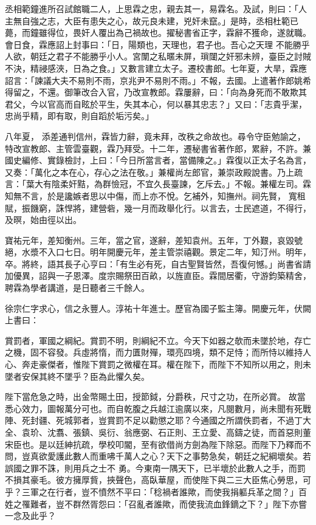 \begin{pinyinscope}
 丞相範鐘進所召試館職二人，上思霖之忠，親去其一，易霖名。及試，則曰：「人主無自強之志，大臣有患失之心，故元良未建，兇奸未竄。」是時，丞相杜範已薨，而鐘雖得位，畏奸人覆出為己禍故也。擢秘書省正字，霖辭不獲命，遂就職。會日食，霖應詔上封事曰：「日，陽類也，天理也，君子也。吾心之天理
 不能勝乎人欲，朝廷之君子不能勝乎小人。宮闈之私暱未屏，瑣闥之奸邪未辨，臺臣之討賊不決，精祲感浹，日為之食。」又數言建立太子。遷校書郎。七年夏，大旱，霖應詔言：「諫議大夫不易則不雨，京兆尹不易則不雨。」不報，去國。上遣著作郎姚希得留之，不還。御筆改合入官，乃改宣教郎。霖屢辭，曰：「向為身死而不敢欺其君父，今以官高而自眩於平生，失其本心，何以暴其忠志？」又曰：「志貴乎潔，忠尚乎精，即有取，則自蹈於垢污矣。」



 八年夏，
 添差通判信州，霖皆力辭，竟未拜，改秩之命故也。尋令守臣勉諭之，特改宣教郎、主管雲臺觀，霖乃拜受。十二年，遷秘書省著作郎，累辭，不許。兼國史編修、實錄檢討，上曰：「今日所當言者，當備陳之。」霖復以正太子名為言，又奏：「萬化之本在心，存心之法在敬。」兼權尚左郎官，兼崇政殿說書。乃上疏言：「葉大有陰柔奸黠，為群憸冠，不宜久長臺諫，乞斥去。」不報。兼權左司。霖知無不言，於是讒嫉者思以中傷，而上亦不悅。乞補外，知撫州。祠先賢，
 寬租賦，振饑窮，誅悍將，建營砦，幾一月而政舉化行。以言去，士民遮道，不得行，及暝，始由徑以出。



 寶祐元年，差知衡州。三年，當之官，遂辭，差知袁州。五年，丁外艱，哀毀號絕，水漿不入口七日。明年開慶元年，差主管崇禧觀。景定二年，知汀州。明年，卒。將終，語其長子心亨曰：「有生必有死，自古聖賢皆然，吾復何憾。」尚書省請加優異，詔與一子恩澤。度宗賜祭田百畝，以旌直臣。霖間居衢，守游鈞築精舍，聘霖為學者講道，是日聽者三千餘人。



 徐宗仁字求心，信之永豐人。淳祐十年進士。歷官為國子監主簿。開慶元年，伏闕上書曰：



 賞罰者，軍國之綱紀。賞罰不明，則綱紀不立。今天下如器之欹而未墜於地，存亡之機，固不容發。兵虛將惰，而力匱財殫，環亮四境，類不足恃；而所恃以維持人心、奔走豪傑者，惟陛下賞罰之微權在耳。權在陛下，而陛下不知所以用之，則未墜者安保其終不墜乎？臣為此懼久矣。



 陛下當危急之時，出金幣賜土田，授節鉞，分爵秩，尺寸之功，在所必賞。
 故當悉心效力，圖報萬分可也。而自乾腹之兵越江逾廣以來，凡閱數月，尚未聞有死戰陣、死封疆、死城郭者，豈賞罰不足以勸懲之耶？今通國之所謂佚罰者，不過丁大全、袁玠、沈翥、張鎮、吳衍、翁應弼、石正則、王立愛、高鑄之徒，而首惡則董宋臣也。是以廷紳抗疏，學校叩閽，至有欲借尚方劍為陛下除惡。而陛下乃釋而不問，豈真欲愛護此數人而重咈千萬人之心？天下之事勢急矣，朝廷之紀綱壞矣。若誤國之罪不誅，則用兵之士不
 勇。今東南一隅天下，已半壞於此數人之手，而罰不損其豪毛。彼方擁厚貲，挾聲色，高臥華屋，而使陛下與二三大臣焦心勞思，可乎？三軍之在行者，豈不憤然不平曰：「稔禍者誰歟，而使我捐軀兵革之間？」百姓之罹難者，豈不群然胥怨曰：「召亂者誰歟，而使我流血鋒鏑之下？」陛下亦嘗一念及此乎？




\end{pinyinscope}
